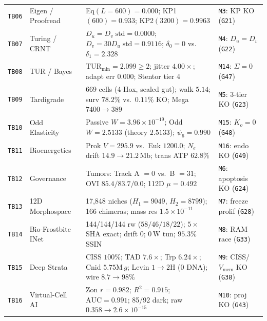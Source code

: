\documentclass[11pt,reqno]{amsart}
\begin{document}
\begin{table}[t]
\begin{tabularx}{\textwidth}{@{}l l L l@{}}
\texttt{TB06} & Eigen / Proofread~\cite{eigen1971selforganization,hopfield1974kinetic} & Eq$(L\!=\!600)=0.000$; KP1$(600)=0.933$; KP2$(3200)=0.9963$ & \texttt{M3}: KP KO (\texttt{G21}) \\
\texttt{TB07} & Turing / CRNT~\cite{turing1952chemical,feinberg1987chemical} & $D_u\!=\!D_v\;\text{std}=0.0000$; $D_v\!=\!30D_u\;\text{std}=0.9116$; $\delta_0=0$ vs.\ $\delta_1=2.328$ & \texttt{M4}: $D_u=D_v$ (\texttt{G22}) \\
\texttt{TB08} & TUR / Bayes~\cite{barato2015thermodynamic} & $\mathrm{TUR}_{\min}=2.099\ge 2$; jitter $4.00\times$; adapt err $0.000$; Stentor tier 4 & \texttt{M14}: $\Sigma=0$ (\texttt{G47}) \\
\texttt{TB09} & Tardigrade~\cite{smith2016compact,polilov2012smallest,hashimoto2016extremotolerant} & 669 cells (4-Hox, sealed gut); walk $5.14$; surv $78.2\%$ vs.\ $0.11\%$ KO; Mega $7400\!\to\!389$ & \texttt{M5}: 3-tier KO (\texttt{G23}) \\
\texttt{TB10} & Odd Elasticity~\cite{scheibner2020odd} & Passive $W=3.96\times 10^{-19}$; Odd $W=2.5133$ (theory $2.5133$); $\psi_6=0.990$ & \texttt{M15}: $K_o=0$ (\texttt{G48}) \\
\texttt{TB11} & Bioenergetics~\cite{lane2010energetics,lynch2015bioenergetic} & Prok $V=295.9$ vs.\ Euk $1200.0$; $N_e$ drift $14.9\!\to\!21.2\,\mathrm{Mb}$; trans ATP $62.8\%$ & \texttt{M16}: endo KO (\texttt{G49}) \\
\texttt{TB12} & Governance & Tumors: Track A $=0$ vs.\ B $=31$; OVI $85.4 / 83.7 / 0.0$; 112D $\mu=0.492$ & \texttt{M6}: apoptosis KO (\texttt{G24}) \\
\texttt{TB13} & 12D Morphospace & 17,848 niches ($H_1=9049$, $H_2=8799$); 166 chimeras; mass res $1.5\times 10^{-11}$ & \texttt{M7}: freeze prolif (\texttt{G28}) \\
\texttt{TB14} & Bio-Frostbite INet~\cite{lafont1990interaction} & 144/144/144 rw ($58/46/18/22$); $5\times$SHA exact; drift $0$; $0\,\mathrm{W}$ tun; $95.3\%$ SSIN & \texttt{M8}: RAM race (\texttt{G33}) \\
\texttt{TB15} & Deep Strata~\cite{naaman2019chiral,chen2014architecture,fudenberg2016formation,nuchter2006nanosecond,levin2021bioelectric,ripoll2023neuropeptidergic,babcock2024ultraviolet} & CISS $100\%$; TAD $7.6\times$; Trp $6.24\times$; Cnid $5.75\mathrm{M}\,g$; Levin $1\!\to\!2\mathrm{H}$ (0 DNA); wire $8.7\!\to\!98\%$ & \texttt{M9}: CISS/$V_{\mathrm{mem}}$ KO (\texttt{G38}) \\
\texttt{TB16} & Virtual-Cell AI~\cite{breuer2019essential,thornburg2022fundamental} & Zon $r=0.982$; $R^2=0.915$; $\mathrm{AUC}=0.991$; 85/92 dark; raw $0.358\!\to\!2.6\times 10^{-15}$ & \texttt{M10}: proj KO (\texttt{G43}) \\
\bottomrule
\end{tabularx}
\end{table}
\end{document}
